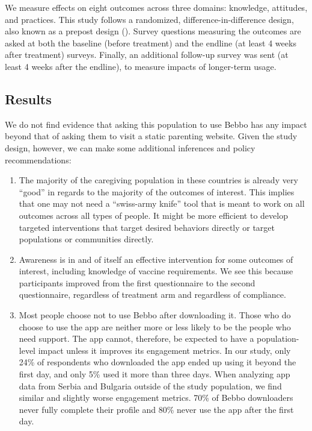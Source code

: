 \documentclass{article}
\begin{document}
We measure effects on eight outcomes across three domains: knowledge, attitudes, and practices. This study follows a randomized, difference-in-difference design, also known as a prepost design (\cite{Clifford2021}). Survey questions measuring the outcomes are asked at both the baseline (before treatment) and the endline (at least 4 weeks after treatment) surveys. Finally, an additional follow-up survey was sent (at least 4 weeks after the endline), to measure impacts of longer-term usage.

\subsection*{Results}

We do not find evidence that asking this population to use Bebbo has any impact beyond that of asking them to visit a static parenting website. Given the study design, however, we can make some additional inferences and policy recommendations:

\begin{enumerate}
\item The majority of the caregiving population in these countries is already very “good” in regards to the majority of the outcomes of interest. This implies that one may not need a ``swiss-army knife'' tool that is meant to work on all outcomes across all types of people. It might be more efficient to develop targeted interventions that target desired behaviors directly or target populations or communities directly.
\item Awareness is in and of itself an effective intervention for some outcomes of interest, including knowledge of vaccine requirements. We see this because participants improved from the first questionnaire to the second questionnaire, regardless of treatment arm and regardless of compliance.
\item Most people choose not to use Bebbo after downloading it. Those who do choose to use the app are neither more or less likely to be the people who need support. The app cannot, therefore, be expected to have a population-level impact unless it improves its engagement metrics. In our study, only 24\% of respondents who downloaded the app ended up using it beyond the first day, and only 5\% used it more than three days. When analyzing app data from Serbia and Bulgaria outside of the study population, we find similar and slightly worse engagement metrics. 70\% of Bebbo downloaders never fully complete their profile and 80\% never use the app after the first day.

\end{enumerate}
\end{document}
